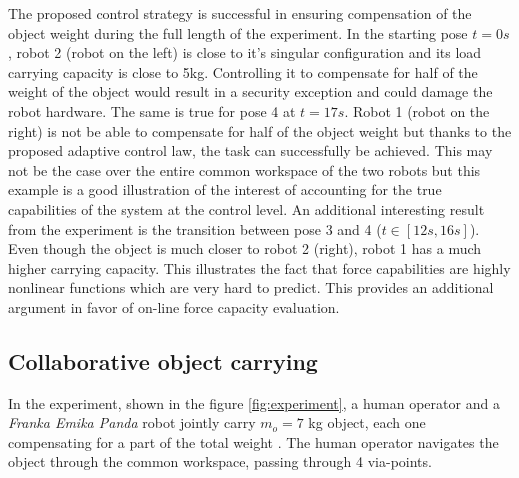 The proposed control strategy is successful in ensuring  compensation of the object weight during the full length of the experiment. In the starting pose $t=0s$, robot 2 (robot on the left) is close to it's singular configuration and its load carrying capacity is close to 5kg. Controlling it to compensate for half of the weight of the object would result in a security exception and could damage the robot hardware. The same is true for pose 4 at $t=17s$. Robot 1 (robot on the right) is not be able to compensate for half of the object weight but thanks to the proposed adaptive control law, the task can successfully be achieved. This may not be the case over the entire common workspace of the two robots but this example is a good illustration of the interest of accounting for the true capabilities of the system at the control level.  An additional interesting result from the experiment is the transition between pose 3 and 4 ($t \in [12s,16s]$). Even though the object is much closer to robot 2 (right), robot 1 has a much higher carrying capacity. This illustrates the fact that force capabilities are highly nonlinear functions which are very hard to predict. This provides an additional argument in favor of on-line force capacity evaluation. 


\subsection{Collaborative object carrying}
In the experiment, shown in the figure \ref{fig:experiment}, a human operator and a \textit{Franka Emika Panda} robot jointly carry $m_o\!=\!7$ kg object, each one compensating for a part of the total weight . The human operator  navigates the object through the common workspace, passing through  4 via-points. 



